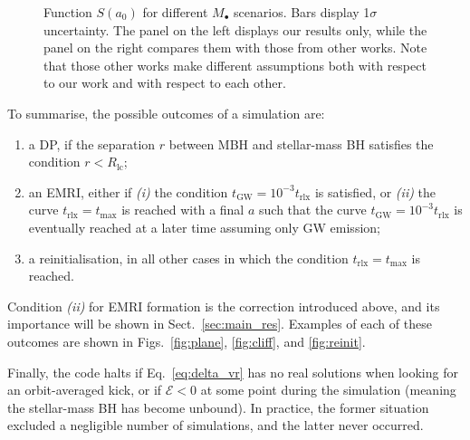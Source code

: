 \documentclass[desactivate]{aa}
\begin{document}
        \begin{figure}
            \centering
            \caption{Function $S(a_0)$ for different $M_\bullet$ scenarios. Bars display 1$\sigma$ uncertainty. The panel on the left displays our results only, while the panel on the right compares them with those from other works. Note that those other works make different assumptions both with respect to our work and with respect to each other.}
            \label{fig:res_comp}
        \end{figure} 

        To summarise, the possible outcomes of a simulation are:
        \begin{enumerate}
            \item a DP, if the separation $r$ between MBH and stellar-mass BH satisfies the condition $r < R_\mathrm{lc}$;
            \item an EMRI, either if \textit{(i)} the condition $t_\mathrm{GW} = 10^{-3} t_\mathrm{rlx}$ is satisfied, or \textit{(ii)} the curve $t_\mathrm{rlx} = t_\mathrm{max}$ is reached with a final $a$ such that the curve $t_\mathrm{GW} = 10^{-3} t_\mathrm{rlx}$ is eventually reached at a later time assuming only GW emission;
            \item a reinitialisation, in all other cases in which the condition $t_\mathrm{rlx} = t_\mathrm{max}$ is reached.
        \end{enumerate}
        Condition \textit{(ii)} for EMRI formation is the correction introduced above, and its importance will be shown in Sect.\ \ref{sec:main_res}.
        Examples of each of these outcomes are shown in Figs.\ \ref{fig:plane}, \ref{fig:cliff}, and \ref{fig:reinit}.
        
        Finally, the code halts if Eq.\ \eqref{eq:delta_vr} has no real solutions when looking for an orbit-averaged kick, or if $\mathcal{E} < 0$ at some point during the simulation (meaning the stellar-mass BH has become unbound). In practice, the former situation excluded a negligible number of simulations, and the latter never occurred.
\end{document}

